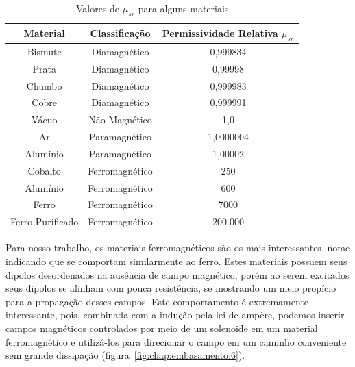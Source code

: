 \documentclass[
        12pt,                           %
        openright,                      %
        twoside,                        %
        a4paper,                        %
        english,                        %
        french,                         %
        spanish,                        %
        brazil                          %
        ]{abntex2}
\begin{document}
\begin{table}[htpb]
  \centering
  \caption{Valores de $\mu_{sr}$ para alguns materiais \cite{book:balanis}}
  \label{tab:chap1:sec2:mu_values}
  \begin{tabular}{c c c}
    \hline
    Material & Classificação & Permissividade Relativa $\mu_{sr}$\\
    \hline
    Bismute & Diamagnético & 0,999834\\
    Prata & Diamagnético & 0,99998\\
    Chumbo & Diamagnético & 0,999983\\
    Cobre & Diamagnético & 0,999991\\
    Vácuo & Não-Magnético & 1,0\\
    Ar & Paramagnético & 1,0000004\\
    Alumínio & Paramagnético & 1,00002\\
    Cobalto & Ferromagnético & 250\\
    Alumínio & Ferromagnético & 600\\
    Ferro & Ferromagnético & 7000\\
    Ferro Purificado & Ferromagnético & 200.000\\
    \hline
  \end{tabular}
\end{table}

Para nosso trabalho, os materiais ferromagnéticos são os mais interessantes, nome
indicando que se comportam similarmente ao ferro. Estes materiais possuem seus dipolos
desordenados na ausência de campo magnético, porém ao serem excitados seus dipolos se
alinham com pouca resistência, se mostrando um meio propício para a propagação desses
campos. Este comportamento é extremamente interessante, pois, combinada com a indução
pela lei de ampère, podemos inserir campos magnéticos controlados por meio de um
solenoide em um material ferromagnético e utilizá-los para direcionar o campo
em um caminho conveniente sem grande dissipação (figura~\ref{fig:chap:embasamento:6}).
\end{document}
